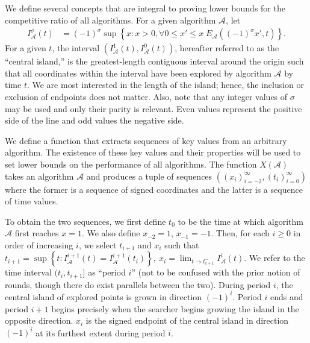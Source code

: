 We define several concepts that are integral to proving lower bounds for the competitive ratio of all algorithms. For a given algorithm $\mathcal{A}$, let
\begin{align*}
  I^\sigma_{\mathcal{A}}(t) &= (-1)^\sigma \sup \left\{x : x>0, \forall 0\leq x'\leq x\; E_{\mathcal{A}}\left((-1)^\sigma x',t\right)\right\} .
\end{align*}
For a given $t$, the interval $\left(I^1_{\mathcal{A}}(t), I^0_{\mathcal{A}}(t)\right)$, hereafter referred to as the ``central island,'' is the greatest-length contiguous interval around the origin such that all coordinates within the interval have been explored by algorithm $\mathcal{A}$ by time $t$. 
We are most interested in the length of the island; hence, the inclusion or exclusion of endpoints does not matter. 
Also, note that any integer values of $\sigma$ may be used and only their parity is relevant.
Even values represent the positive side of the line and odd values the negative side.

We define a function that extracts sequences of key values from an arbitrary algorithm. The existence of these key values and their properties will be used to set lower bounds on the performance of all algorithms. The function $X(\mathcal{A})$ takes an algorithm $\mathcal{A}$ and produces a tuple of sequences $\left(\left(x_i\right)_{i=-2}^{\infty}, \left(t_i\right)_{i=0}^{\infty}\right)$ where the former is a sequence of signed coordinates and the latter is a sequence of time values.

To obtain the two sequences, we first define $t_0$ to be the time at which algorithm $\mathcal{A}$ first reaches $x=1$. We also define $x_{-2}=1$, $x_{-1} = -1$. Then, for each $i\geq 0$ in order of increasing $i$, we select $t_{i+1}$ and $x_i$ such that
  $t_{i+1} = \sup \left\{t : I^{i+1}_{\mathcal{A}}(t) = I^{i+1}_{\mathcal{A}}(t_i)\right\} ,~
  x_i = \lim_{t\to t_{i+1}^-} I^i_{\mathcal{A}}(t)$.
We refer to the time interval $(t_i, t_{i+1}]$ as ``period $i$'' (not to be confused with the prior notion of rounds, though there do exist parallels between the two). During period $i$, the central island of explored points is grown in direction $(-1)^i$. Period $i$ ends and period $i+1$ begins precisely when the searcher begins growing the island in the opposite direction. $x_i$ is the signed endpoint of the central island in direction $(-1)^i$ at its furthest extent during period $i$.

